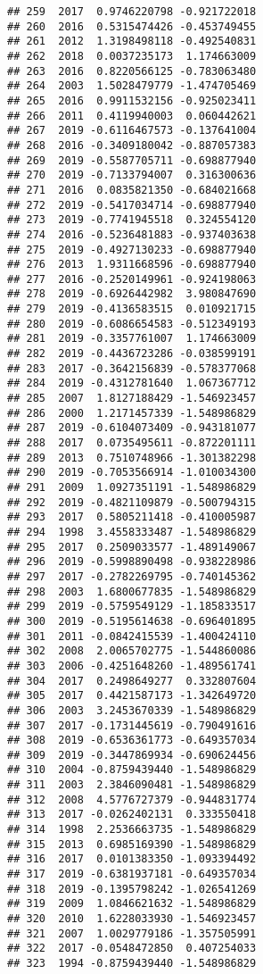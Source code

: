\documentclass[
]{article}
\begin{document}
\begin{verbatim}
## 259  2017  0.9746220798 -0.921722018
## 260  2016  0.5315474426 -0.453749455
## 261  2012  1.3198498118 -0.492540831
## 262  2018  0.0037235173  1.174663009
## 263  2016  0.8220566125 -0.783063480
## 264  2003  1.5028479779 -1.474705469
## 265  2016  0.9911532156 -0.925023411
## 266  2011  0.4119940003  0.060442621
## 267  2019 -0.6116467573 -0.137641004
## 268  2016 -0.3409180042 -0.887057383
## 269  2019 -0.5587705711 -0.698877940
## 270  2019 -0.7133794007  0.316300636
## 271  2016  0.0835821350 -0.684021668
## 272  2019 -0.5417034714 -0.698877940
## 273  2019 -0.7741945518  0.324554120
## 274  2016 -0.5236481883 -0.937403638
## 275  2019 -0.4927130233 -0.698877940
## 276  2013  1.9311668596 -0.698877940
## 277  2016 -0.2520149961 -0.924198063
## 278  2019 -0.6926442982  3.980847690
## 279  2019 -0.4136583515  0.010921715
## 280  2019 -0.6086654583 -0.512349193
## 281  2019 -0.3357761007  1.174663009
## 282  2019 -0.4436723286 -0.038599191
## 283  2017 -0.3642156839 -0.578377068
## 284  2019 -0.4312781640  1.067367712
## 285  2007  1.8127188429 -1.546923457
## 286  2000  1.2171457339 -1.548986829
## 287  2019 -0.6104073409 -0.943181077
## 288  2017  0.0735495611 -0.872201111
## 289  2013  0.7510748966 -1.301382298
## 290  2019 -0.7053566914 -1.010034300
## 291  2009  1.0927351191 -1.548986829
## 292  2019 -0.4821109879 -0.500794315
## 293  2017  0.5805211418 -0.410005987
## 294  1998  3.4558333487 -1.548986829
## 295  2017  0.2509033577 -1.489149067
## 296  2019 -0.5998890498 -0.938228986
## 297  2017 -0.2782269795 -0.740145362
## 298  2003  1.6800677835 -1.548986829
## 299  2019 -0.5759549129 -1.185833517
## 300  2019 -0.5195614638 -0.696401895
## 301  2011 -0.0842415539 -1.400424110
## 302  2008  2.0065702775 -1.544860086
## 303  2006 -0.4251648260 -1.489561741
## 304  2017  0.2498649277  0.332807604
## 305  2017  0.4421587173 -1.342649720
## 306  2003  3.2453670339 -1.548986829
## 307  2017 -0.1731445619 -0.790491616
## 308  2019 -0.6536361773 -0.649357034
## 309  2019 -0.3447869934 -0.690624456
## 310  2004 -0.8759439440 -1.548986829
## 311  2003  2.3846090481 -1.548986829
## 312  2008  4.5776727379 -0.944831774
## 313  2017 -0.0262402131  0.333550418
## 314  1998  2.2536663735 -1.548986829
## 315  2013  0.6985169390 -1.548986829
## 316  2017  0.0101383350 -1.093394492
## 317  2019 -0.6381937181 -0.649357034
## 318  2019 -0.1395798242 -1.026541269
## 319  2009  1.0846621632 -1.548986829
## 320  2010  1.6228033930 -1.546923457
## 321  2007  1.0029779186 -1.357505991
## 322  2017 -0.0548472850  0.407254033
## 323  1994 -0.8759439440 -1.548986829

\end{verbatim}
\end{document}
